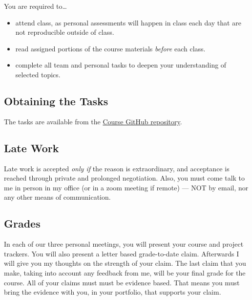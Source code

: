 \documentclass[12pt]{amsart}
\begin{document}
You are required to\ldots
\begin{itemize}
\item attend class, as personal assessments will happen in class each day that are not reproducible outside of class.
\item read assigned portions of the course materials \textit{before} each class.
\item complete all team and personal tasks to deepen your understanding of selected topics.
\end{itemize}



\subsection{Obtaining the Tasks} The tasks are available from the \href{https://github.com/yenrab/ErlangTutorialTasks}{Course GitHub repository}.
\subsection{Late Work} Late work is accepted \textit{only if} the reason is extraordinary, and acceptance is reached through private and prolonged negotiation. Also, you must come talk to me in person in my office (or in a zoom meeting if remote) --- NOT by email, nor any other means of communication.

\subsection{Grades} In each of our three personal meetings, you will present your course and project trackers. You will also present a letter based grade-to-date claim. Afterwards I will give you my thoughts on the strength of your claim. The last claim that you make, taking into account any feedback from me, will be your final grade for the course. All of your claims must must be evidence based. That means you must bring the evidence with you, in your portfolio, that supports your claim. 
\end{document}

